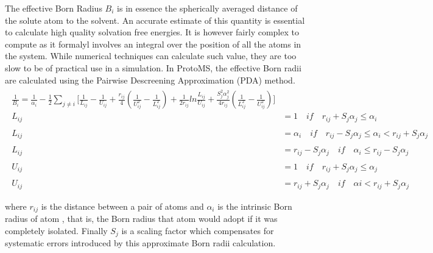 \documentclass[letterpaper,10pt,english]{sphinxmanual}
\begin{document}
The effective Born Radius \(B_{i}\) is in essence the spherically averaged distance of the solute atom to the solvent. An accurate estimate of this quantity is essential to calculate high quality solvation free energies. It is however fairly complex to compute as it formalyl involves an integral over the position of all the atoms in the system. While numerical techniques can calculate such value, they are too slow to be of practical use in a simulation. In ProtoMS, the effective Born radii are calculated using the Pairwise Descreening Approximation (PDA) method.
\begin{align*}\!\begin{aligned}
{\frac{1}{B_i}} = \frac{1}{\alpha _{i}} - \frac{1}{2} \sum_{j \not= i} \lbrack \frac{1}{L_{ij}}-\frac{1}{U_{ij}}+\frac{r_{ij}}{4}(\frac{1}{U_{ij}^{2}}-\frac{1}{L_{ij}^{2}}) +\frac{1}{2r_{ij}}ln\frac{L_{ij}}{U_{ij}} + \frac{S_{j}^{2}\alpha_{j}^{2}}{4r_{ij}}(\frac{1}{L_{ij}^{2}}-\frac{1}{U_{ij}^{2}} ) \rbrack\\
L_{ij} &= 1 \quad if \quad r_{ij} + S_{j}\alpha_{j} \leq \alpha_{i} \\\\
L_{ij} &= \alpha_{i} \quad if \quad r_{ij} - S_{j}\alpha_{j} \leq \alpha_{i}  <r_{ij} + S_{j}\alpha_{j}\\\\
L_{ij} &= r_{ij} - S_{j}\alpha_{j} \quad if \quad \alpha_{i} \leq r_{ij} - S_{j}\alpha_{j}\\\\
U_{ij} &= 1 \quad if \quad  r_{ij} + S_{j}\alpha_{j} \leq \alpha_{j}\\\\
U_{ij} &= r_{ij} + S_{j}\alpha_{j} \quad if \quad \alpha{i} <  r_{ij} + S_{j}\alpha_{j}\\\\
\end{aligned}\end{align*}
where \(r_{ij}\) is the distance between a pair of atoms  and \(\alpha_{i}\) is the intrinsic Born radius of atom , that is, the Born radius that atom  would adopt if it was completely isolated. Finally \(S_{j}\) is a scaling factor which compensates for systematic errors introduced by this approximate Born radii calculation.
\end{document}
